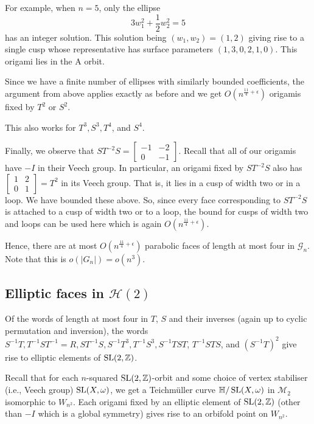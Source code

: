 \documentclass[a4paper,11pt]{amsart}
\numberwithin{equation}{section}
\numberwithin{figure}{section}
\numberwithin{table}{section}
\newcommand{\teichmuller}{Teichm{\"u}ller }
\newcommand{\calH}{\mathcal{H}}
\newcommand{\Z}{\mathbb{Z}}
\DeclareMathOperator{\SL}{{\rm{SL}}}
\begin{document}
For example, when $n = 5$, only the ellipse
\[3w_{1}^{2} + \frac{1}{2}w_{2}^{2} = 5\]
has an integer solution. This solution being $(w_{1},w_{2}) = (1,2)$ giving rise to a single cusp whose representative has surface parameters $(1,3,0,2,1,0)$. This origami lies in the A orbit.

Since we have a finite number of ellipses with similarly bounded coefficients, the argument from above applies exactly as before and we get $O(n^{\frac{11}{4}+\epsilon})$ origamis fixed by $T^2$ or $S^2$.

This also works for $T^3, S^3, T^4$, and $S^4$.

Finally, we observe that $ST^{-2}S = \begin{bmatrix}
    -1 & -2 \\
    0 & -1
\end{bmatrix}$. Recall that all of our origamis have $-I$ in their Veech group. In particular, an origami fixed by $ST^{-2}S$ also has $\begin{bmatrix}
    1 & 2 \\
    0 & 1
\end{bmatrix} = T^{2}$ in its Veech group. That is, it lies in a cusp of width two or in a loop. We have bounded these above. So, since every face corresponding to $ST^{-2}S$ is attached to a cusp of width two or to a loop, the bound for cusps of width two and loops can be used here which is again $O(n^{\frac{11}{4}+\epsilon})$.

Hence, there are at most $O(n^{\frac{11}{4}+\epsilon})$ parabolic faces of length at most four in $\mathcal{G}_{n}$. Note that this is $o(|G_{n}|) = o(n^3)$.


\subsection{Elliptic faces in $\calH(2)$}\label{subsec:ell-H2}

Of the words of length at most four in $T$, $S$ and their inverses (again up to cyclic permutation and inversion), the words $S^{-1}T, T^{-1}ST^{-1} = R, ST^{-1}S, S^{-1}T^3, T^{-1}S^3, S^{-1}TST$, $T^{-1}STS$, and $(S^{-1}T)^2$ give rise to elliptic elements of $\SL(2,\Z)$.

Recall that for each $n$-squared $\SL(2,\Z)$-orbit and some choice of vertex stabiliser (i.e., Veech group) $\SL(X,\omega)$, we get a \teichmuller curve $\mathbb{H}/\SL(X,\omega)$ in $\mathcal{M}_{2}$ isomorphic to $W_{n^{2}}$. Each origami fixed by an elliptic element of $\SL(2,\Z)$ (other than $-I$ which is a global symmetry) gives rise to an orbifold point on $W_{n^{2}}$.
\end{document}
